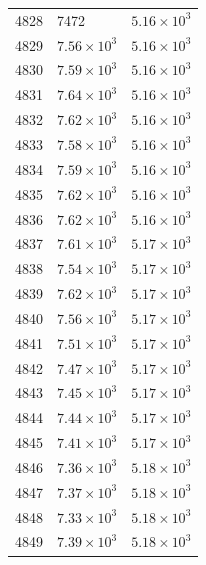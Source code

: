 \begin{table}[H]
\begin{tabular}{lll}
4828 & 7472 & $\displaystyle 5.16 \times 10^{3}$ \\
4829 & $\displaystyle 7.56 \times 10^{3}$ & $\displaystyle 5.16 \times 10^{3}$ \\
4830 & $\displaystyle 7.59 \times 10^{3}$ & $\displaystyle 5.16 \times 10^{3}$ \\
4831 & $\displaystyle 7.64 \times 10^{3}$ & $\displaystyle 5.16 \times 10^{3}$ \\
4832 & $\displaystyle 7.62 \times 10^{3}$ & $\displaystyle 5.16 \times 10^{3}$ \\
4833 & $\displaystyle 7.58 \times 10^{3}$ & $\displaystyle 5.16 \times 10^{3}$ \\
4834 & $\displaystyle 7.59 \times 10^{3}$ & $\displaystyle 5.16 \times 10^{3}$ \\
4835 & $\displaystyle 7.62 \times 10^{3}$ & $\displaystyle 5.16 \times 10^{3}$ \\
4836 & $\displaystyle 7.62 \times 10^{3}$ & $\displaystyle 5.16 \times 10^{3}$ \\
4837 & $\displaystyle 7.61 \times 10^{3}$ & $\displaystyle 5.17 \times 10^{3}$ \\
4838 & $\displaystyle 7.54 \times 10^{3}$ & $\displaystyle 5.17 \times 10^{3}$ \\
4839 & $\displaystyle 7.62 \times 10^{3}$ & $\displaystyle 5.17 \times 10^{3}$ \\
4840 & $\displaystyle 7.56 \times 10^{3}$ & $\displaystyle 5.17 \times 10^{3}$ \\
4841 & $\displaystyle 7.51 \times 10^{3}$ & $\displaystyle 5.17 \times 10^{3}$ \\
4842 & $\displaystyle 7.47 \times 10^{3}$ & $\displaystyle 5.17 \times 10^{3}$ \\
4843 & $\displaystyle 7.45 \times 10^{3}$ & $\displaystyle 5.17 \times 10^{3}$ \\
4844 & $\displaystyle 7.44 \times 10^{3}$ & $\displaystyle 5.17 \times 10^{3}$ \\
4845 & $\displaystyle 7.41 \times 10^{3}$ & $\displaystyle 5.17 \times 10^{3}$ \\
4846 & $\displaystyle 7.36 \times 10^{3}$ & $\displaystyle 5.18 \times 10^{3}$ \\
4847 & $\displaystyle 7.37 \times 10^{3}$ & $\displaystyle 5.18 \times 10^{3}$ \\
4848 & $\displaystyle 7.33 \times 10^{3}$ & $\displaystyle 5.18 \times 10^{3}$ \\
4849 & $\displaystyle 7.39 \times 10^{3}$ & $\displaystyle 5.18 \times 10^{3}$ \\

\end{tabular}
\end{table}

